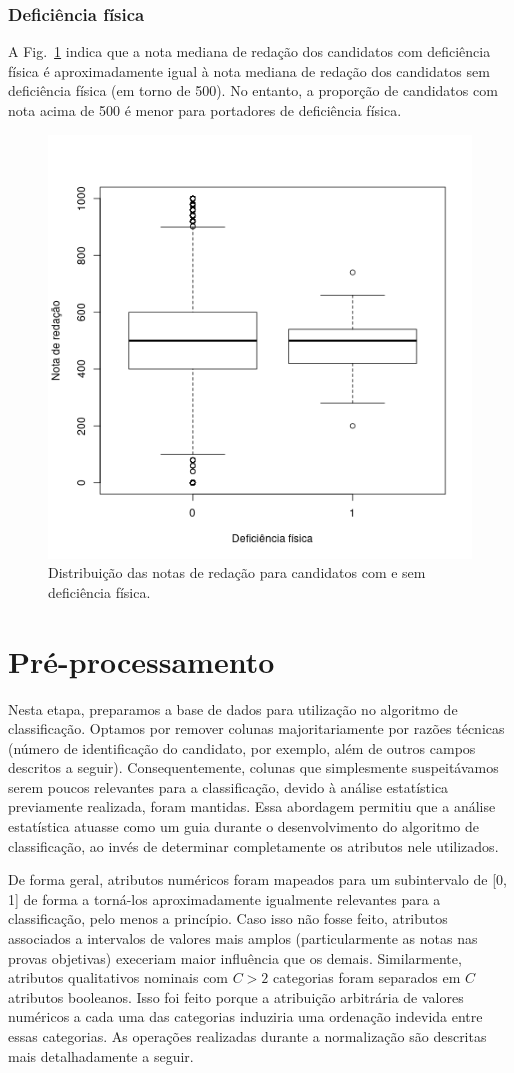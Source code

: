 \documentclass[12pt]{article}
\newcommand{\reffig}[1]{Fig.~\ref{fig:#1}}
\begin{document}
\subsubsection{Deficiência física}
A \reffig{correlacao-deficiencia-fisica} indica que a nota mediana de redação dos candidatos com deficiência física é aproximadamente igual à nota mediana de redação dos candidatos sem deficiência física (em torno de 500).
No entanto, a proporção de candidatos com nota acima de 500 é menor para portadores de deficiência física.
\begin{figure}[H]
\centering\includegraphics[width=.5\linewidth]{../correlacao_deficiencia_fisica.png}
\caption{Distribuição das notas de redação para candidatos com e sem deficiência física.}
\label{fig:correlacao-deficiencia-fisica}
\end{figure}

\section{Pré-processamento}
Nesta etapa, preparamos a base de dados para utilização no algoritmo de classificação.
Optamos por remover colunas majoritariamente por razões técnicas (número de identificação do candidato, por exemplo, além de outros campos descritos a seguir). Consequentemente, colunas que simplesmente suspeitávamos serem poucos relevantes para a classificação, devido à análise estatística previamente realizada, foram mantidas.
Essa abordagem permitiu que a análise estatística atuasse como um guia durante o desenvolvimento do algoritmo de classificação, ao invés de determinar completamente os atributos nele utilizados.

De forma geral, atributos numéricos foram mapeados para um subintervalo de [0, 1] de forma a torná-los aproximadamente igualmente relevantes para a classificação, pelo menos a princípio.
Caso isso não fosse feito, atributos associados a intervalos de valores mais amplos (particularmente as notas nas provas objetivas) execeriam maior influência que os demais.
Similarmente, atributos qualitativos nominais com $C > 2$ categorias foram separados em $C$ atributos booleanos.
Isso foi feito porque a atribuição arbitrária de valores numéricos a cada uma das categorias induziria uma ordenação indevida entre essas categorias.
As operações realizadas durante a normalização são descritas mais detalhadamente a seguir.
\end{document}
